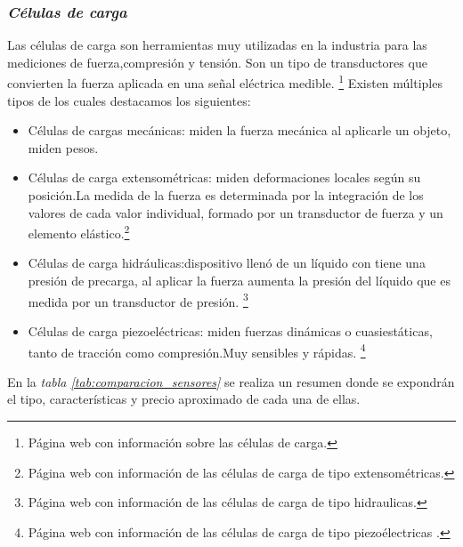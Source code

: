 \subsubsection{\textit{{Células de carga}}}
Las células de carga son herramientas muy utilizadas en la industria para las mediciones de fuerza,compresión y tensión.
Son un tipo de transductores que convierten la fuerza aplicada  en una señal eléctrica medible. \cite{Celula_Carga}\footnote{Página web con información sobre las células de carga\cite{Celula_Carga}.}
Existen múltiples tipos de los cuales destacamos los siguientes:
    \begin{itemize}
        \item Células de cargas mecánicas: miden la fuerza mecánica al aplicarle un objeto, miden pesos.
        \item Células de carga extensométricas: miden deformaciones locales según su posición.La medida de la fuerza es determinada por la integración de los valores de cada valor individual, formado por un transductor de fuerza y un elemento elástico.\cite{celulas_extensométricas}\footnote{Página web con información de las células de carga de tipo extensométricas\cite{celulas_extensométricas}.}
        \item Células de carga hidráulicas:dispositivo llenó de un líquido con tiene una presión de precarga, al aplicar la fuerza aumenta la presión del líquido que es medida por un transductor de presión.
        \cite{Celulas_hidraulicas}\footnote{Página web con información de las células de carga de tipo hidraulicas\cite{Celulas_hidraulicas}.}
        \item Células de carga piezoeléctricas: miden fuerzas dinámicas o cuasiestáticas, tanto de tracción como compresión.Muy sensibles y rápidas.
        \cite{Celulas_piezoelectricas}\footnote{Página web con información de las células de carga de tipo piezoélectricas \cite{Celulas_piezoelectricas}.}
    \end{itemize}
En la \textit{tabla \ref{tab:comparacion_sensores}} se realiza un resumen donde se expondrán el tipo, características y precio aproximado de cada una de ellas.
